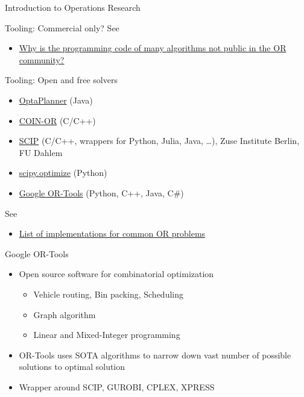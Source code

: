 \documentclass[
  ignorenonframetext,
]{beamer}
\providecommand{\tightlist}{%
  \setlength{\itemsep}{0pt}\setlength{\parskip}{0pt}}\usepackage{longtable,booktabs,array}
\begin{document}
\begin{frame}{Introduction to Operations Research}
\begin{block}{Tooling: Commercial only?}
See

\begin{itemize}
\tightlist
\item
  \href{https://or.stackexchange.com/questions/61/why-is-the-programming-code-of-many-algorithms-not-public-in-the-or-community}{Why
  is the programming code of many algorithms not public in the OR
  community?}
\end{itemize}
\end{block}

\begin{block}{Tooling: Open and free solvers}
\protect\hypertarget{tooling-open-and-free-solvers}{}
\begin{itemize}
\tightlist
\item
  \href{https://www.optaplanner.org/}{OptaPlanner} (Java)
\item
  \href{https://www.coin-or.org/}{COIN-OR} (C/C++)
\item
  \href{https://www.scipopt.org/}{SCIP} (C/C++, wrappers for Python,
  Julia, Java, \ldots), Zuse Institute Berlin, FU Dahlem
\item
  \href{https://docs.scipy.org/doc/scipy/reference/optimize.html}{scipy.optimize}
  (Python)
\item
  \href{https://developers.google.com/optimization}{Google OR-Tools}
  (Python, C++, Java, C\#)
\end{itemize}

See

\begin{itemize}
\tightlist
\item
  \href{https://or.stackexchange.com/questions/841/list-of-implementations-for-common-or-problems}{List
  of implementations for common OR problems}
\end{itemize}
\end{block}

\begin{block}{Google OR-Tools}
\protect\hypertarget{google-or-tools}{}
\begin{itemize}
\tightlist
\item
  Open source software for combinatorial optimization

  \begin{itemize}
  \tightlist
  \item
    Vehicle routing, Bin packing, Scheduling
  \item
    Graph algorithm
  \item
    Linear and Mixed-Integer programming
  \end{itemize}
\item
  OR-Tools uses SOTA algorithms to narrow down vast number of possible
  solutions to optimal solution
\item
  Wrapper around SCIP, GUROBI, CPLEX, XPRESS
\end{itemize}
\end{block}


\end{frame}
\end{document}
